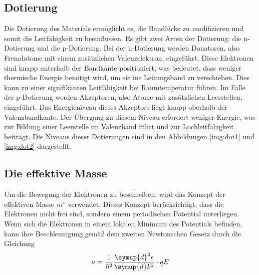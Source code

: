     \subsection{Dotierung}

    Die Dotierung des Materials ermöglicht es, die Bandlücke zu modifizieren und somit die Leitfähigkeit zu beeinflussen. Es gibt zwei Arten der Dotierung: die n-Dotierung und die p-Dotierung.
Bei der n-Dotierung werden Donatoren, also Fremdatome mit einem zusätzlichen Valenzelektron, eingeführt. Diese Elektronen sind knapp unterhalb der Bandkante positioniert, was bedeutet, dass weniger thermische Energie benötigt wird, um sie ins Leitungsband zu verschieben. Dies kann zu einer signifikanten Leitfähigkeit bei Raumtemperatur führen.
Im Falle der p-Dotierung werden Akzeptoren, also Atome mit zusätzlichen Leerstellen, eingeführt. Das Energieniveau dieses Akzeptors liegt knapp oberhalb der Valenzbandkante. Der Übergang zu diesem Niveau erfordert weniger Energie, was zur Bildung einer Leerstelle im Valenzband führt und zur Lochleitfähigkeit beiträgt.
Die Niveaus dieser Dotierungen sind in den Abbildungen \autoref{img:dot1} und \autoref{img:dot2} dargestellt.



    \subsection{Die effektive Masse}

    Um die Bewegung der Elektronen zu beschreiben, wird das Konzept der effektiven Masse $m^∗$ verwendet. Dieses Konzept berücksichtigt, dass die Elektronen nicht frei sind, sondern einem periodischen Potential unterliegen. Wenn sich die Elektronen in einem lokalen Minimum des Potentials befinden, kann ihre Beschleunigung gemäß dem zweiten Newtonschen Gesetz durch die Gleichung
    \begin{align*}
        a =\frac{1}{\hslash^2}\frac{\symup{d}^2\epsilon}{\symup{d}k^2} \cdot qE
    \end{align*}

